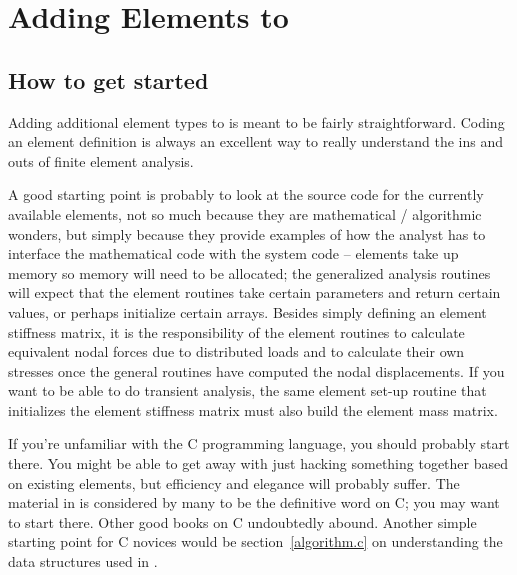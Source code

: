 
\newpage{\pagestyle{empty}\cleardoublepage}

\chapter{Adding Elements to \felt{}}
\label{adding_elts}

\section{How to get started}

Adding additional element types to \felt{} is meant to be fairly 
straightforward.  Coding an element definition is always an excellent way 
to really understand the ins and outs of finite element analysis.       

A good starting point is probably to look at the source code for the currently 
available elements, not so much because they are mathematical / algorithmic 
wonders, but simply because they provide examples of how the analyst has to 
interface the mathematical code with the system code -- elements take up 
memory so memory will need to be allocated; the generalized analysis routines 
will expect that the element routines take certain parameters and return 
certain values, or perhaps initialize certain arrays.  Besides simply defining 
an element stiffness matrix, it is the responsibility of the element routines 
to calculate equivalent nodal forces due to distributed loads and to calculate 
their own stresses once the general routines have computed the nodal 
displacements.  If you want to be able to do transient analysis, the same
element set-up routine that initializes the element stiffness matrix
must also build the element mass matrix.         

If you're unfamiliar with the C programming language, you should probably
start there.  You might be able to get away with just hacking something
together based on existing elements, but efficiency and elegance will
probably suffer.  The material in \cite{knr} is considered by many to be
the definitive word on C; you may want to start there.  Other good books
on C undoubtedly abound.  Another simple starting point for C novices would be
section~\ref{algorithm.c} on understanding the data structures used in \felt{}.

